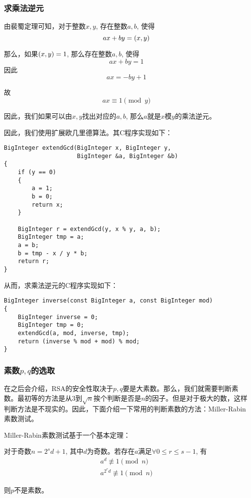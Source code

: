 \subsubsection{求乘法逆元}
由裴蜀定理可知，对于整数$x, y$, 存在整数$a, b$, 使得
\begin{equation}
ax+by=\left( {x, y}\right)
\end{equation}

那么，如果$\left( {x,y}\right) = 1$, 那么存在整数$a, b$, 使得
\begin{equation}
ax+by=1
\end{equation}
因此
\[ax=-by+1\]

故
\begin{equation}
ax\equiv 1\pmod{y}
\end{equation}

因此，我们如果可以由$x, y$找出对应的$a, b$, 那么$a$就是$x$模$y$的乘法逆元。\par
因此，我们使用扩展欧几里德算法。其C程序实现如下：
\begin{prove}
\begin{verbatim}
BigInteger extendGcd(BigInteger x, BigInteger y,
                     BigInteger &a, BigInteger &b)
{
    if (y == 0)
    {
        a = 1;
        b = 0;
        return x;
    }
    
    BigInteger r = extendGcd(y, x % y, a, b);
    BigInteger tmp = a;
    a = b;
    b = tmp - x / y * b;
    return r;
}
\end{verbatim}
\end{prove}

从而，求乘法逆元的C程序实现如下：
\begin{prove}
\begin{verbatim}
BigInteger inverse(const BigInteger a, const BigInteger mod)
{
    BigInteger inverse = 0;
    BigInteger tmp = 0;
    extendGcd(a, mod, inverse, tmp);
    return (inverse % mod + mod) % mod;
}
\end{verbatim}
\end{prove}
\subsubsection{素数$p, q$的选取}
在之后会介绍，RSA的安全性取决于$p, q$要是大素数。那么，我们就需要判断素数。最初等的方法是从$3$到$\sqrt{n}$挨个判断是否是$n$的因子。但是对于极大的数，这样判断方法是不现实的。因此，下面介绍一下常用的判断素数的方法：Miller-Rabin素数测试。\par
Miller-Rabin素数测试基于一个基本定理：
\begin{theorem}
对于奇数$n=2^sd+1$, 其中$d$为奇数。若存在$a$满足$\forall 0\leq r\leq s-1$, 有
\begin{gather}
a^d\not\equiv 1\pmod{n}\\
a^{2^rd}\not\equiv 1\pmod{n}
\end{gather}

则$p$不是素数。
\end{theorem}

